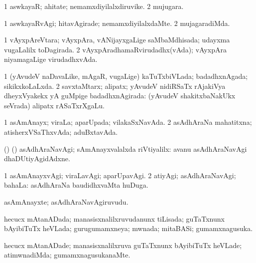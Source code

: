 \bentry
{} 
\gl{\nA}
\expl{}
\bmng
\bnum
\num{1} aswkayaR; ahitate; nemamxdiyilalxdiruvike. 
\num{2} mujugara. 
\enum
\emng
\eentry

\bentry
{} 
\gl{\kirxvi}
\expl{}
\bmng
\bnum
\num{1} aswkayaRvAgi; hitavAgirade; nemamxdiyilalxdaMte. 
\num{2} mujagaradiMda. 
\enum
\emng
\eentry

\bentry
{}
\gl{\gu}
\expl{}
\bmng
\bnum
\num{1} vAyxpAreVtara; vAyxpAra, vANijayxgaLige saMbaMdhisada; udayxma \mo vugaLalilx toDagirada. 
\num{2} vAyxpAradhamaRvirudadhx(vAda); vAyxpAra niyamagaLige virudadhxvAda. 
\enum
\emng
\eentry

\bentry
{} 
\gl{\gu}
\expl{}
\bmng
\bnum
\num{1} (yAvudeV naDavaLike, mAgaR, \mo vugaLige) kaTuTxbiVLada; badadhxnAgada; sikikxkoLaLxda. 
\num{2} savxtaMtarx; alipatx; yAvudeV nidiRSaTx rAjakiVya dheyxVyakekx yA guMpige badadhxnAgirada:  (yAvudeV shakitxbaNakUkx seVrada) alipatx rASaTxrXgaLu. 
\enum
\emng
\eentry

\bentry
{} 
\gl{\gu}
\expl{}
\bmng
\bnum
\num{1} asAmAnayx; viraLa; aparUpada; vilakaSxNavAda. 
\num{2} asAdhAraNa mahatitxna; atisherxVSaThxvAda; aduBxtavAda. 
\enum
\emng
\eentry

\bentry
{}
\gl{\kirxvi}
\expl{}
\bmng
 (\pArxparx) (\AmA) asAdhAraNavAgi; sAmAnayxvalalxda riVtiyalilx:  avanu asAdhAraNavAgi dhaDUtiyAgidAdxne. 
\emng
\eentry

\bentry
{} 
\gl{\kirxvi}
\expl{}
\bmng
\bnum
\num{1} asAmAnayxvAgi; viraLavAgi; aparUpavAgi. 
\num{2} atiyAgi; asAdhAraNavAgi; bahaLa:  asAdhAraNa baudidhxvaMta huDuga. 
\enum
\emng
\eentry

\bentry
{} 
\gl{\nA}
\expl{}
\bmng
 asAmAnayxte; asAdhAraNavAgiruvudu. 
\emng
\eentry

\bentry
{} 
\gl{\gu}
\expl{}
\bmng
 hecucx mAtanADada; manasisxnalilxruvudanunx tiLisada; guTaTxnunx bAyibiTuTx heVLada; gurugumamxneya; mwnada; mitaBASi; gumamxnagusuka. 
\emng
\eentry

\bentry
{} 
\gl{\kirxvi}
\expl{}
\bmng
 hecucx mAtanADade; manasisxnalilxruva guTaTxnunx bAyibiTuTx heVLade; atimwnadiMda; gumamxnagusukanaMte. 
\emng
\eentry

